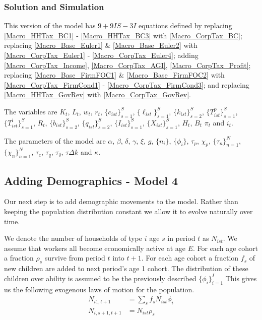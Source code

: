 \documentclass[letterpaper,12pt]{article}
\theoremstyle{definition}
\numberwithin{equation}{section}
\begin{document}
\begin{spacing}{1.5}
    \subsubsection{Solution and Simulation}
      This version of the model has $9+9IS-3I$ equations defined by replacing \eqref{Macro_HHTax_BC1} - \eqref{Macro_HHTax_BC3} with \eqref{Macro_CorpTax_BC}; replacing \eqref{Macro_Base_Euler1} \& \eqref{Macro_Base_Euler2} with \eqref{Macro_CorpTax_Euler1} - \eqref{Macro_CorpTax_Euler4}; adding \eqref{Macro_CorpTax_Income}, \eqref{Macro_CorpTax_AGI}, \eqref{Macro_CorpTax_Profit}; replacing \eqref{Macro_Base_FirmFOC1} \& \eqref{Macro_Base_FirmFOC2} with \eqref{Macro_CorpTax_FirmCond1} - \eqref{Macro_CorpTax_FirmCond3}; and replacing \eqref{Macro_HHTax_GovRev} with \eqref{Macro_CorpTax_GovRev}.  

      The variables are $K_t$, $L_t$, $w_t$, $r_t$, $\{c_{ist}\}_{s=1}^S$, $\{\ell_{ist}\}_{s=1}^S$, $\{k_{ist}\}_{s=2}^S$, $\{T^p_{ist}\}_{s=1}^S$, $\{T^i_{ist}\}_{s=1}^S$, $R_t$, $\{b_{ist}\}_{s=2}^S$, $\{q_{ist}\}_{s=2}^S$, $\{I_{ist}\}_{s=1}^S$, $\{X_{ist}\}_{s=1}^S$, $H_t$, $B_t$ $\pi_t$ and $i_t$.

      The parameters of the model are $\alpha$, $\beta$, $\delta$, $\gamma$, $\xi$, $g$, $\{n_i\}$, $\{\phi_i\}$, $\tau_p$, $\chi_p$, $\{\tau_n\}_{n=1}^N$, $\{\chi_n\}_{n=1}^N$, $\tau_c$, $\tau_q$, $\tau_\delta$, $\tau{\Delta k}$ and $\kappa$.

  \subsection{Adding Demographics - Model 4}\label{SubSec_Macro_Demog}
    Our next step is to add demographic movements to the model.  Rather than keeping the population distribution constant we allow it to evolve naturally over time.

    We denote the number of households of type $i$ age $s$ in period $t$ as $N_{ist}$.  We assume that workers all become economically active at age $E$.  For each age cohort a fraction $\rho_s$ survive from period $t$ into $t+1$.  For each age cohort a fraction $f_s$ of new children are added to next period's age 1 cohort.  The distribution of these children over ability is assumed to be the previously described $\{\phi_i\}_{i=1}^I$  This gives us the following exogenous laws of motion for the population.
    \begin{align}
    N_{i1,t+1} & = \sum_s f_s N_{ist} \phi_i \\
    N_{i,s+1,t+1} & = N_{ist} \rho_s
    \end{align}


\end{spacing}
\end{document}
